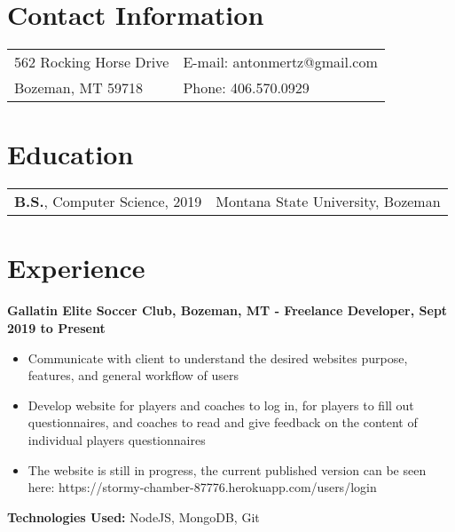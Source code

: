 \documentclass[margin,line]{res}
\begin{document}
\begin{resume}
\section{\sc Contact Information}

\vspace{.05in}

\begin{tabular}{@{}p{4in}p{4in}}
    \\
				562 Rocking Horse Drive & {E-mail:} antonmertz@gmail.com \\ 
				Bozeman, MT 59718 & {Phone:} 406.570.0929 \\ 
\end{tabular}

\vspace*{.05in}

\section{\sc Education}
\begin{tabular}{@{}p{4in}p{4in}}
\textbf{B.S.}, Computer Science, 2019 & Montana State University, Bozeman \\
\end{tabular}

\vspace*{.05in}

\section{\sc Experience} 
				{\bf Gallatin Elite Soccer Club, Bozeman, MT - Freelance Developer, Sept 2019 to Present} \\
				\begin{itemize}
				\item	Communicate with client to understand the desired websites purpose, features, and general workflow of users 
				\item Develop website for players and coaches to log in, for players to fill out questionnaires, and coaches to read and give feedback on the content of individual players questionnaires
				\item The website is still in progress, the current published version can be seen here: https://stormy-chamber-87776.herokuapp.com/users/login
				\end{itemize}
				{\bf Technologies Used: }NodeJS, MongoDB, Git


\end{resume}
\end{document}
